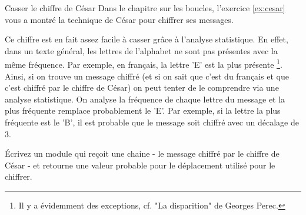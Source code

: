 \begin{Exercice}{Casser le chiffre de César}
	Dans le chapitre sur les boucles, l'exercice \vref{ex:cesar}
	vous a montré la technique de César pour chiffrer ses messages.
	
	Ce chiffre est en fait assez facile à casser grâce à l'analyse statistique.
	En effet, dans un texte général, les lettres de l'alphabet ne sont pas
	présentes avec la même fréquence. 
	Par exemple, en français, la lettre 'E' est la plus présente%
	\footnote{%
		Il y a évidemment des exceptions, cf. "La disparition" de Georges Perec.
	}.
	Ainsi, si on trouve un message chiffré 
	(et si on sait que c'est du français et que c'est chiffré par le chiffre de César)
	on peut tenter de le comprendre via une analyse statistique. 
	On analyse la fréquence de chaque lettre du message et la plus fréquente remplace
	probablement le 'E'. Par exemple, si la lettre la plus fréquente est le 'B',
	il est probable que le message soit chiffré avec un décalage de 3.
	
	Écrivez un module qui reçoit une chaine 
	- le message chiffré par le chiffre de César -
	et retourne une valeur probable pour le déplacement utilisé pour le chiffrer.
\end{Exercice}

